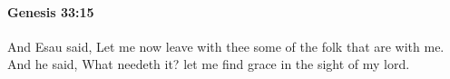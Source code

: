 
		\paragraph{Genesis 33:15} %
			\label{GENESIS-33-15}

			And Esau said, Let me now leave with thee some of the folk that are with me. And he said, What needeth it? let me find grace in the sight of my lord.


